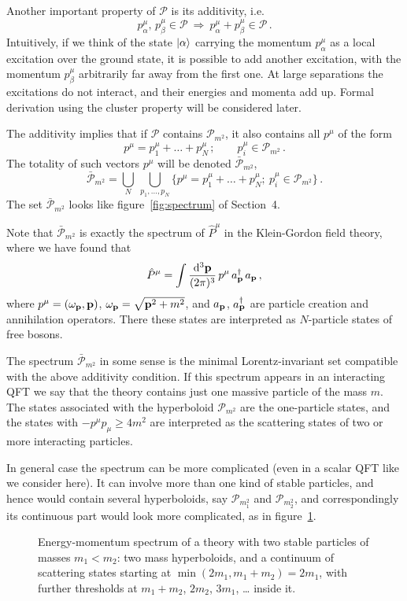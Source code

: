 Another important property of $\mathcal P$ is its additivity, i.e.
\[
p^\mu_\alpha,\,p^\mu_\beta\in\mathcal P\ \Rightarrow\ p^\mu_\alpha+p^\mu_\beta\in\mathcal P\,.
\]
Intuitively, if we think of the state $|\alpha\rangle$ carrying the momentum
$p^\mu_\alpha$ as a local excitation over the ground state, it is possible to add
another excitation, with the momentum $p^\mu_\beta$ arbitrarily far away from the
first one. At large separations the excitations do not interact, and their energies
and momenta add up. Formal derivation using the cluster property will be considered
later.

The additivity implies that if $\mathcal P$ contains $\mathcal P_{m^2}$, it also
contains all $p^\mu$ of the form
\[
p^\mu=p_1^\mu+\dots+p_N^\mu\,;\qquad p_i^\mu\in\mathcal P_{m^2}\,.
\]
The totality of such vectors $p^\mu$ will be denoted $\bar{\mathcal P}_{m^2}$,
\[
\bar{\mathcal P}_{m^2}=\bigcup_N\ \bigcup_{p_1,\dots,p_N}\bigl\{p^\mu=p_1^\mu+\dots+p_N^\mu;\ p_i^\mu\in\mathcal P_{m^2}\bigr\}\,.
\]
The set $\bar{\mathcal P}_{m^2}$ looks like figure~\ref{fig:spectrum} of
Section~4.

Note that $\bar{\mathcal P}_{m^2}$ is exactly the spectrum of $\hat P^\mu$ in the
Klein-Gordon field theory, where we have found that
\[
\hat P^\mu=\int\frac{\mathop{}\!\mathrm{d}^3\mathbf{p}}{(2\pi)^3}\,p^\mu\,a^\dagger_{\mathbf{p}}\,a_{\mathbf{p}}\,,
\]
where $p^\mu=(\omega_{\mathbf{p}},\mathbf{p})$, $\omega_{\mathbf{p}}=\sqrt{\mathbf{p}^2+m^2}$, and $a_{\mathbf{p}}$,
$a^\dagger_{\mathbf{p}}$ are particle creation and annihilation operators. There these
states are interpreted as $N$-particle states of free bosons.

The spectrum $\bar{\mathcal P}_{m^2}$ in some sense is the minimal Lorentz-invariant
set compatible with the above additivity condition. If this spectrum appears in an
interacting QFT we say that the theory contains just one massive particle of the
mass $m$. The states associated with the hyperboloid $\mathcal P_{m^2}$ are the
one-particle states, and the states with $-p^\mu p_\mu\ge4m^2$ are interpreted as the
scattering states of two or more interacting particles.

In general case the spectrum can be more complicated (even in a scalar QFT like we
consider here). It can involve more than one kind of stable particles, and hence
would contain several hyperboloids, say $\mathcal P_{m_1^2}$ and
$\mathcal P_{m_2^2}$, and correspondingly its continuous part would look more
complicated, as in figure~\ref{fig:spectrum2}.
\begin{figure}[ht]
\centering{}
\caption{Energy-momentum spectrum of a theory with two stable particles of masses
$m_1<m_2$: two mass hyperboloids, and a continuum of scattering states starting at
$\min(2m_1,m_1+m_2)=2m_1$, with further thresholds at $m_1+m_2$, $2m_2$, $3m_1$,
\ldots{} inside it.}
\label{fig:spectrum2}
\end{figure}

